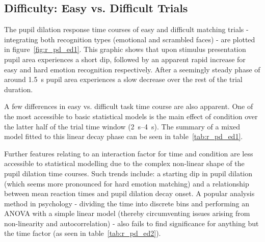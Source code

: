 	\subsection{Difficulty: Easy vs. Difficult Trials}\label{sec:r_pd_ed}
	    The pupil dilation response time courses of easy and difficult matching trials - integrating both recognition types (emotional and scrambled faces) - are plotted in figure~\ref{fig:r_pd_ed1}.
	    This graphic shows that upon stimulus presentation pupil area experiences a short dip, followed by an apparent rapid increase for easy and hard emotion recognition respectively.
	    After a seemingly steady phase of around \SI{1.5}{\second} pupil area experiences a slow decrease over the rest of the trial duration. 
	    
	    A few differences in easy vs. difficult task time course are also apparent.
	    One of the most accessible to basic statistical models is the main effect of condition over the latter half of the trial time window (\SIrange{2}{4}{\second}).
	    The summary of a mixed model fitted to this linear decay phase can be seen in table~\ref{tab:r_pd_ed1}.
	    

	    Further features relating to an interaction factor for time and condition are less accessible to statistical modelling due to the complex non-linear shape of the pupil dilation time courses.
	    Such trends include: a starting dip in pupil dilation (which seems more pronounced for hard emotion matching) and a relationship between mean reaction times and pupil dilation decay onset. 
	    A popular analysis method in psychology - dividing the time into discrete bins and performing an ANOVA with a simple linear model (thereby circumventing issues arising from non-linearity and autocorrelation) - also fails to find significance for anything but the time factor (as seen in table~\ref{tab:r_pd_ed2}).
	
